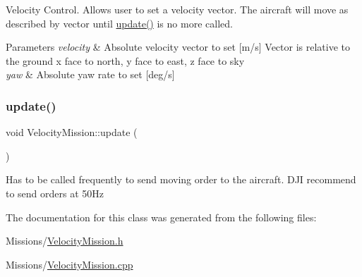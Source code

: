 Velocity Control. Allows user to set a velocity vector. The aircraft will move as described by vector until \mbox{\hyperlink{class_m210_1_1_velocity_mission_a709e74d4c01378c7cd2bcbab602bba2c}{update()}} is no more called. 
\begin{DoxyParams}{Parameters}
{\em velocity} & Absolute velocity vector to set \mbox{[}m/s\mbox{]} Vector is relative to the ground x face to north, y face to east, z face to sky \\
\hline
{\em yaw} & Absolute yaw rate to set \mbox{[}deg/s\mbox{]} \\
\hline
\end{DoxyParams}
\mbox{\label{class_m210_1_1_velocity_mission_a709e74d4c01378c7cd2bcbab602bba2c}} 
\subsubsection{\texorpdfstring{update()}{update()}}
{\footnotesize\ttfamily void Velocity\+Mission\+::update (\begin{DoxyParamCaption}{ }\end{DoxyParamCaption})}

Has to be called frequently to send moving order to the aircraft. D\+JI recommend to send orders at 50\+Hz 

The documentation for this class was generated from the following files\+:\begin{DoxyCompactItemize}
\item 
Missions/\mbox{\hyperlink{_velocity_mission_8h}{Velocity\+Mission.\+h}}\item 
Missions/\mbox{\hyperlink{_velocity_mission_8cpp}{Velocity\+Mission.\+cpp}}\end{DoxyCompactItemize}
